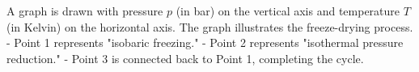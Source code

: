 A graph is drawn with pressure \( p \) (in bar) on the vertical axis and temperature \( T \) (in Kelvin) on the horizontal axis. The graph illustrates the freeze-drying process.  
- Point 1 represents "isobaric freezing."  
- Point 2 represents "isothermal pressure reduction."  
- Point 3 is connected back to Point 1, completing the cycle.